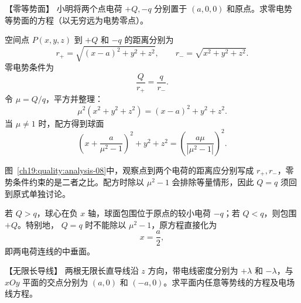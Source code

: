 \begin{origexamplebox}{【零等势面】}\label{ch19:ex:s33-2-4}
小明将两个点电荷 $+Q,-q$ 分别置于 $(a,0,0)$ 和原点。求零电势等势面的方程（以无穷远为电势零点）。

\ThQZeroPotential
\end{origexamplebox}\par\nopagebreak[4]

\begin{xesolution}
空间点 $P(x,y,z)$ 到 $+Q$ 和 $-q$ 的距离分别为
\[
  r_+=\sqrt{(x-a)^2+y^2+z^2},
  \qquad r_-=\sqrt{x^2+y^2+z^2}.
\]
零电势条件为
\[
  \frac{Q}{r_+}=\frac{q}{r_-}.
\]
令 $\mu=Q/q$，平方并整理：
\[
  \mu^2(x^2+y^2+z^2)=(x-a)^2+y^2+z^2.
\]
当 $\mu\ne1$ 时，配方得到球面
\[
  \boxed{\left(x+\frac{a}{\mu^2-1}\right)^2+y^2+z^2
  =\left(\frac{a\mu}{|\mu^2-1|}\right)^2}.
\]

\begin{qualityfigure}
\ThZeroPotentialAnalysisDrawing
{}\label{ch19:quality:analysis-08}
\end{qualityfigure}
图~\ref{ch19:quality:analysis-08}中，观察点到两个电荷的距离应分别写成 $r_+,r_-$，零势条件约束的是二者之比。配方时除以 $\mu^2-1$ 会排除等量情形，因此 $Q=q$ 须回到原式单独讨论。

若 $Q>q$，球心在负 $x$ 轴，球面包围位于原点的较小电荷 $-q$；若 $Q<q$，则包围 $+Q$。特别地，
$Q=q$ 时不能除以 $\mu^2-1$，原方程直接化为
\[
  \boxed{x=\frac a2},
\]
即两电荷连线的中垂面。
\end{xesolution}



\begin{origexamplebox}{【无限长导线】}\label{ch19:ex:s33-2-5}
两根无限长直导线沿 $z$ 方向，带电线密度分别为 $+\lambda$ 和 $-\lambda$，与 $xOy$ 平面的交点分别为
$(a,0)$ 和 $(-a,0)$。求平面内任意等势线的方程及电场线方程。

\ThQTwoLines
\end{origexamplebox}\par\nopagebreak[4]

